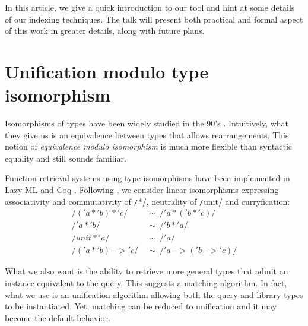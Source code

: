 \documentclass [a4paper,11pt] {scrartcl}
\begin{document}
In this article, we give a quick introduction to our tool and hint at some details of our indexing techniques. The talk will present both practical and formal aspect of this work in greater details, along with future plans.



\section {Unification modulo type isomorphism}

Isomorphisms of types have been widely studied in the 90's \cite {dicosmo}. Intuitively, what they give us is an equivalence between types that allows rearrangements. This notion of \emph {equivalence modulo isomorphism} is much more flexible than syntactic equality and still sounds familiar.

Function retrieval systems using type isomorphisms have been implemented in Lazy ML \cite {rittri} and Coq \cite {delahaye}. Following \cite {rittri}, we consider linear isomorphisms expressing associativity and commutativity of \texttt/*/, neutrality of \texttt/unit/ and curryfication:
\begin {align*}
  \texttt/('a * 'b) * 'c/ &\ \sim\ \texttt/'a * ('b * 'c)/ \\
  \texttt/'a * 'b/ &\ \sim\ \texttt/'b * 'a/ \\
  \texttt/unit * 'a/ &\ \sim\ \texttt/'a/ \\
  \texttt/('a * 'b) -> 'c/ &\ \sim\ \texttt/'a -> ('b -> 'c)/
\end {align*}

What we also want is the ability to retrieve more general types that admit an instance equivalent to the query. This suggests a matching algorithm. In fact, what we use is an unification algorithm \cite {boudet} allowing both the query and library types to be instantiated. Yet, matching can be reduced to unification and it may become the default behavior.

\end{document}
